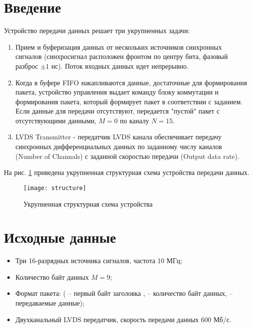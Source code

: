 





\tableofcontents
\lstlistoflistings
\listoffigures
\newpage

\section{Введение}

Устройство передачи данных решает три укрупненных задачи:
\begin{enumerate}
	\item Прием и буферизация данных от нескольких источников синхронных сигналов (синхросигнал расположен фронтом по центру бита, фазовый разброс $\pm1$ нс). Поток входных данных идет непрерывно.
	\item Когда в буфере FIFO накапливаются данные, достаточные для формирования пакета, устройство управления выдает команду блоку коммутации и формирования пакета, который формирует пакет в соответствии с заданием. Если данные для передачи отсутствуют, передается "пустой" пакет с отсутствующими данными, $M=0$ по каналу $N=15$.
	\item LVDS Transmitter - передатчик LVDS канала обеспечивает передачу синхронных дифференциальных данных по заданному числу каналов (Number of Channals) с заданной скоростью передачи (Output data rate).
\end{enumerate}

На рис. \ref{fig:structure} приведена укрупненная структурная схема устройства передачи данных.
\begin{figure}[H]
	\centering
	\texttt{[image: structure]}
	\caption{Укрупненная структурная схема устройства}
	\label{fig:structure}
\end{figure}

\section{Исходные данные}

\begin{itemize}
	\item Три 16-разрядных источника сигналов, частота 10 МГц;
	\item Количество байт данных $M = 9$;
	\item Формат пакета:  ( -- первый байт заголовка ,  -- количество байт данных,  -- передаваемые данные);
 	\item Двухканальный LVDS передатчик, скорость передачи данных $600$ Мб/с.
\end{itemize}

